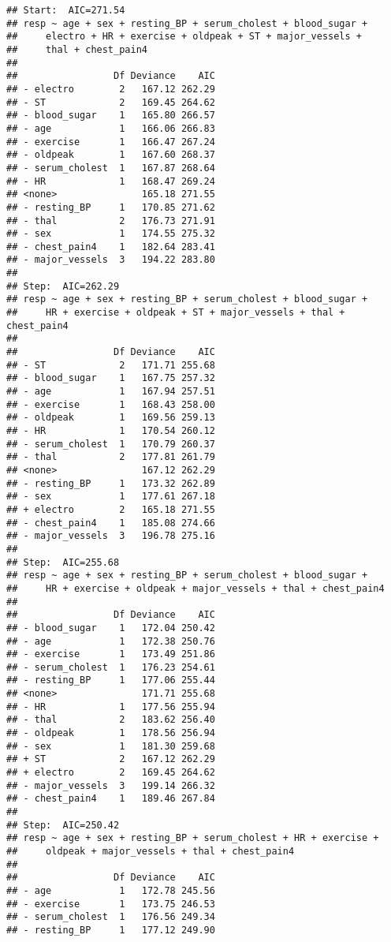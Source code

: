\documentclass[]{article}
\begin{document}
\begin{verbatim}
## Start:  AIC=271.54
## resp ~ age + sex + resting_BP + serum_cholest + blood_sugar + 
##     electro + HR + exercise + oldpeak + ST + major_vessels + 
##     thal + chest_pain4
## 
##                 Df Deviance    AIC
## - electro        2   167.12 262.29
## - ST             2   169.45 264.62
## - blood_sugar    1   165.80 266.57
## - age            1   166.06 266.83
## - exercise       1   166.47 267.24
## - oldpeak        1   167.60 268.37
## - serum_cholest  1   167.87 268.64
## - HR             1   168.47 269.24
## <none>               165.18 271.55
## - resting_BP     1   170.85 271.62
## - thal           2   176.73 271.91
## - sex            1   174.55 275.32
## - chest_pain4    1   182.64 283.41
## - major_vessels  3   194.22 283.80
## 
## Step:  AIC=262.29
## resp ~ age + sex + resting_BP + serum_cholest + blood_sugar + 
##     HR + exercise + oldpeak + ST + major_vessels + thal + chest_pain4
## 
##                 Df Deviance    AIC
## - ST             2   171.71 255.68
## - blood_sugar    1   167.75 257.32
## - age            1   167.94 257.51
## - exercise       1   168.43 258.00
## - oldpeak        1   169.56 259.13
## - HR             1   170.54 260.12
## - serum_cholest  1   170.79 260.37
## - thal           2   177.81 261.79
## <none>               167.12 262.29
## - resting_BP     1   173.32 262.89
## - sex            1   177.61 267.18
## + electro        2   165.18 271.55
## - chest_pain4    1   185.08 274.66
## - major_vessels  3   196.78 275.16
## 
## Step:  AIC=255.68
## resp ~ age + sex + resting_BP + serum_cholest + blood_sugar + 
##     HR + exercise + oldpeak + major_vessels + thal + chest_pain4
## 
##                 Df Deviance    AIC
## - blood_sugar    1   172.04 250.42
## - age            1   172.38 250.76
## - exercise       1   173.49 251.86
## - serum_cholest  1   176.23 254.61
## - resting_BP     1   177.06 255.44
## <none>               171.71 255.68
## - HR             1   177.56 255.94
## - thal           2   183.62 256.40
## - oldpeak        1   178.56 256.94
## - sex            1   181.30 259.68
## + ST             2   167.12 262.29
## + electro        2   169.45 264.62
## - major_vessels  3   199.14 266.32
## - chest_pain4    1   189.46 267.84
## 
## Step:  AIC=250.42
## resp ~ age + sex + resting_BP + serum_cholest + HR + exercise + 
##     oldpeak + major_vessels + thal + chest_pain4
## 
##                 Df Deviance    AIC
## - age            1   172.78 245.56
## - exercise       1   173.75 246.53
## - serum_cholest  1   176.56 249.34
## - resting_BP     1   177.12 249.90

\end{verbatim}
\end{document}
